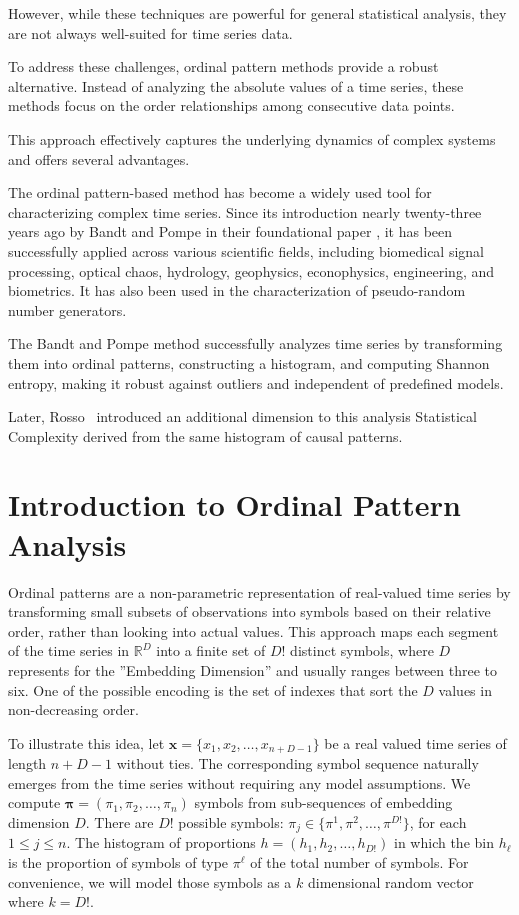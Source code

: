 However, while these techniques are powerful for general statistical analysis, they are not always well-suited for time series data. 

To address these challenges, ordinal pattern methods provide a robust alternative. Instead of analyzing the absolute values of a time series, these methods focus on the order relationships among consecutive data points.

This approach effectively captures the underlying dynamics of complex systems and offers several advantages.

The ordinal pattern-based method has become a widely used tool for characterizing complex time series. Since its introduction nearly twenty-three years ago by Bandt and Pompe in their foundational paper \cite{PhysRevLett.88.174102}, it has been successfully applied across various scientific fields, including biomedical signal processing, optical chaos, hydrology, geophysics, econophysics, engineering, and biometrics. It has also been used in the characterization of pseudo-random number generators.

The Bandt and Pompe method successfully analyzes time series by transforming them into ordinal patterns, constructing a histogram, and computing Shannon entropy, making it robust against outliers and independent of predefined models.

Later, Rosso~\cite{EEGAnalysisUsingWaveletBasedInformationTools} introduced an additional dimension to this analysis Statistical Complexity derived from the same histogram of causal patterns.

\section*{Introduction to Ordinal Pattern Analysis}

Ordinal patterns are a non-parametric representation of real-valued time series by transforming small subsets of observations into symbols based on their relative order, rather than looking into actual values. This approach maps each segment of the time series in $\mathbb{R}^D$ into a finite set of $D!$ distinct symbols, where $D$ represents for the ''Embedding Dimension'' and usually ranges between three to six. 
One of the possible encoding is the set of indexes that sort the $D$ values in non-decreasing order.

To illustrate this idea, let $\bm{x}=\{x_1,x_2, \dots, x_{n+D-1}\}$ 
be a real valued time series of length $n+D-1$ without ties. 
The corresponding symbol sequence naturally emerges from the time series without requiring any model assumptions. We compute
$\bm{{\pi}}=({\pi}_1, {\pi}_2,\dots, {\pi}_n)$ symbols from sub-sequences of embedding dimension $D$. 
There are $D!$ possible symbols: $\pi_j \in \{{\pi}^1, {\pi}^2,\dots, {\pi}^{D!}\}$, for each $1\leq j\leq n$.
The histogram of proportions $h=(h_1,h_2,\dots, h_{D!})$ in which the bin $h_\ell$ 
is the proportion of symbols of type $\pi^\ell$ of the total number of symbols. 
For convenience, we will model those symbols as a $k$ dimensional random vector where $k=D!$.

